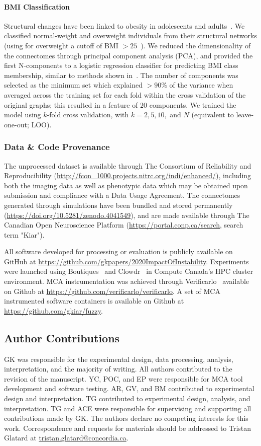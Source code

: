 \documentclass[fleqn,10pt]{SelfArx} %
\begin{document}
\paragraph{BMI Classification} Structural changes have been linked to obesity in adolescents and
adults~\cite{Raji2010-lh}. We classified normal-weight and overweight individuals from their structural networks (using
for overweight a cutoff of BMI $> 25$~\cite{Gupta2015-ap}). We reduced the dimensionality of the connectomes through
principal component analysis (PCA), and provided the first N-components to a logistic regression classifier for
predicting BMI class membership, similar to methods shown in~\cite{Gupta2015-ap,Park2015-uj}. The number of components
was selected as the minimum set which explained $> 90\%$ of the variance when averaged across the training set for each
fold within the cross validation of the original graphs; this resulted in a feature of $20$ components. We trained the
model using $k$-fold cross validation, with $k = 2, 5, 10,$ and $N$ (equivalent to leave-one-out; LOO).

\subsubsection*{Data \& Code Provenance}
The unprocessed dataset is available through The Consortium of Reliability and Reproducibility
(\url{http://fcon_1000.projects.nitrc.org/indi/enhanced/}), including both the imaging data as well as phenotypic data
which may be obtained upon submission and compliance with a Data Usage Agreement. The connectomes generated through
simulations have been bundled and stored permanently (\url{https://doi.org/10.5281/zenodo.4041549}), and are made
available through The Canadian Open Neuroscience Platform (\url{https://portal.conp.ca/search}, search term "Kiar").

All software developed for processing or evaluation is publicly available on GitHub at
\url{https://github.com/gkpapers/2020ImpactOfInstability}. Experiments were launched using
Boutiques~\cite{Glatard2018-tu} and Clowdr~\cite{Kiar2019-sr} in Compute Canada's HPC cluster environment. MCA
instrumentation was achieved through Verificarlo~\cite{Denis2016-wo} available on Github at
\url{https://github.com/verificarlo/verificarlo}. A set of MCA instrumented software containers is available on Github
at \url{https://github.com/gkiar/fuzzy}.


\subsection*{Author Contributions}
GK was responsible for the experimental design, data processing, analysis, interpretation, and the majority of writing.
All authors contributed to the revision of the manuscript. YC, POC, and EP were responsible for MCA tool development
and software testing. AR, GV, and BM contributed to experimental design and interpretation. TG contributed to
experimental design, analysis, and interpretation. TG and ACE were responsible for supervising and supporting all
contributions made by GK. The authors declare no competing interests for this work. Correspondence and requests for
materials should be addressed to Tristan Glatard at \url{tristan.glatard@concordia.ca}.
\end{document}
